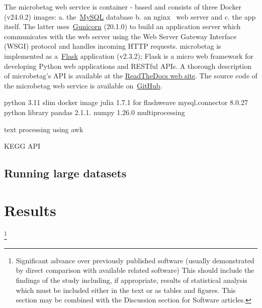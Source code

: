 \documentclass[sn-mathphys,Numbered, lineno]{sn-jnl}  %
\theoremstyle{thmstyleone}%
\theoremstyle{thmstyletwo}%
\theoremstyle{thmstylethree}%
\begin{document}
        The microbetag web service is container - based and consists of three Docker~\cite{merkel2014docker} (v24.0.2) images: 
        a. the~\href{https://www.mysql.com}{MySQL} database 
        b. an nginx~\cite{nginx} web server and 
        c. the app itself. 
        The latter uses~\href{https://gunicorn.org}{Gunicorn} (20.1.0) to build an application server which communicates with the web server using the Web Server Gateway Interface (WSGI) protocol and handles incoming HTTP requests.
        microbetag is implemented as a~\href{https://flask.palletsprojects.com/en/3.0.x/}{Flask} application (v2.3.2); Flask is 
        a micro web framework for developing Python web applications and RESTful APIs. 
        A thorough description of microbetag's API is available at the \href{https://hariszaf.github.io/microbetag/docs/api/}{ReadTheDocs web site}. 
        The source code of the microbetag web service is available on~\href{https://github.com/msysbio/microbetagApp/}{GitHub}.

        python 3.11 slim docker image 
        julia 1.7.1 for flashweave 
        mysql.connector 8.0.27 python library
        pandas 2.1.1.
        numpy 1.26.0
        multiprocessing

        text processing using awk 

        KEGG API




    \subsection{Running large datasets}
    \label{subsec:large-datasets}







\section{Results}
\label{sec:results}

    \footnote{
        Significant advance over previously published software (usually demonstrated by direct comparison with available related software)
        This should include the findings of the study including, if appropriate, results of statistical analysis which must be included either in the text or as tables and figures. 
        This section may be combined with the Discussion section for Software articles.
    }
\end{document}
